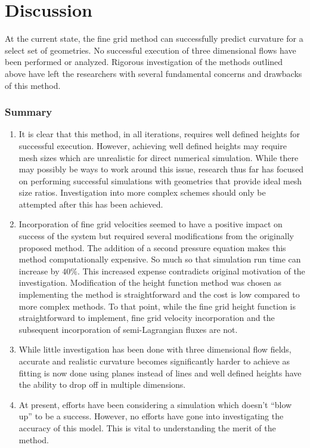 \chapter{Discussion}  
At the current state, the fine grid method can successfully predict curvature for a select set of geometries. No successful execution of three dimensional flows have been performed or analyzed. Rigorous investigation of the methods outlined above have left the researchers with several fundamental concerns and drawbacks of this method.
\subsection{Summary}
\begin{enumerate}
	\item It is clear that this method, in all iterations, requires well defined heights for successful execution. However, achieving well defined heights may require mesh sizes which are unrealistic for direct numerical simulation. While there may possibly be ways to work around this issue, research thus far has focused on performing successful simulations with geometries that provide ideal mesh size ratios. Investigation into more complex schemes should only be attempted after this has been achieved.
	\item Incorporation of fine grid velocities seemed to have a positive impact on success of the system but required several modifications from the originally proposed method. The addition of a second pressure equation makes this method computationally expensive. So much so that simulation run time can increase by $40\%$. This increased expense contradicts original motivation of the investigation. Modification of the height function method was chosen as implementing the method is straightforward and the cost is low compared to more complex methods. To that point, while the fine grid height function is straightforward to implement, fine grid velocity incorporation and the subsequent incorporation of semi-Lagrangian fluxes are not. 
	\item While little investigation has been done with three dimensional flow fields, accurate and realistic curvature becomes significantly harder to achieve as fitting is now done using planes instead of lines and well defined heights have the ability to drop off in multiple dimensions.
	\item At present, efforts have been considering a simulation which doesn't ``blow up'' to be a success. However, no efforts have gone into investigating the accuracy of this model. This is vital to understanding the merit of the method. 
\end{enumerate} 

